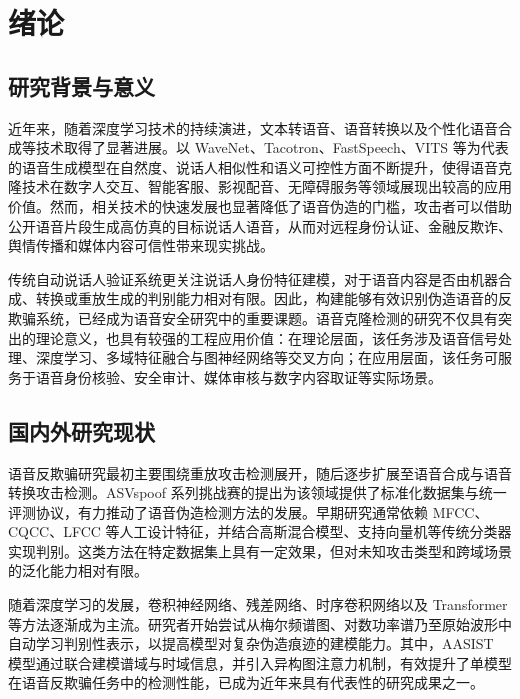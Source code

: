 \documentclass{xduugthesis}
\begin{document}
\chapter{绪论}

\section{研究背景与意义}

近年来，随着深度学习技术的持续演进，文本转语音、语音转换以及个性化语音合成等技术取得了显著进展。以 WaveNet、Tacotron、FastSpeech、VITS 等为代表的语音生成模型在自然度、说话人相似性和语义可控性方面不断提升，使得语音克隆技术在数字人交互、智能客服、影视配音、无障碍服务等领域展现出较高的应用价值。然而，相关技术的快速发展也显著降低了语音伪造的门槛，攻击者可以借助公开语音片段生成高仿真的目标说话人语音，从而对远程身份认证、金融反欺诈、舆情传播和媒体内容可信性带来现实挑战\cite{wuzetal2015,kinnunen2017,todisco2019}。

传统自动说话人验证系统更关注说话人身份特征建模，对于语音内容是否由机器合成、转换或重放生成的判别能力相对有限。因此，构建能够有效识别伪造语音的反欺骗系统，已经成为语音安全研究中的重要课题。语音克隆检测的研究不仅具有突出的理论意义，也具有较强的工程应用价值：在理论层面，该任务涉及语音信号处理、深度学习、多域特征融合与图神经网络等交叉方向；在应用层面，该任务可服务于语音身份核验、安全审计、媒体审核与数字内容取证等实际场景。

\section{国内外研究现状}

语音反欺骗研究最初主要围绕重放攻击检测展开，随后逐步扩展至语音合成与语音转换攻击检测。ASVspoof 系列挑战赛的提出为该领域提供了标准化数据集与统一评测协议，有力推动了语音伪造检测方法的发展\cite{wuzetal2015,kinnunen2017,todisco2019,wang2020asvspoof,yamagishi2021}。早期研究通常依赖 MFCC、CQCC、LFCC 等人工设计特征，并结合高斯混合模型、支持向量机等传统分类器实现判别。这类方法在特定数据集上具有一定效果，但对未知攻击类型和跨域场景的泛化能力相对有限。

随着深度学习的发展，卷积神经网络、残差网络、时序卷积网络以及 Transformer 等方法逐渐成为主流。研究者开始尝试从梅尔频谱图、对数功率谱乃至原始波形中自动学习判别性表示，以提高模型对复杂伪造痕迹的建模能力\cite{jung2022aasist,tak2021rawnet2,velickovic2018}。其中，AASIST 模型通过联合建模谱域与时域信息，并引入异构图注意力机制，有效提升了单模型在语音反欺骗任务中的检测性能，已成为近年来具有代表性的研究成果之一\cite{jung2022aasist,tak2021stgat}。
\end{document}
